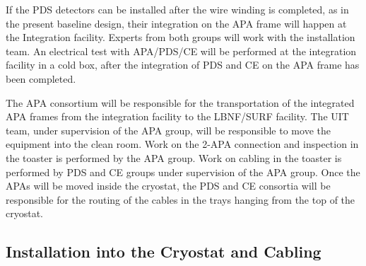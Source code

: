 
If the PDS detectors can be installed after the wire winding is completed, as in the present baseline design, their integration on the APA frame will happen at the Integration facility. Experts from both groups will work with the installation team. 
An electrical test with APA/PDS/CE will be performed at the integration facility in a cold box, after the integration of PDS and CE on the APA frame has been completed.

The APA consortium will be responsible for the transportation of the integrated APA frames from the integration facility to the LBNF/SURF facility. 
The UIT team, under supervision of the APA group, will be responsible to move the equipment into the clean room. 
Work on the 2-APA connection and inspection in the toaster is performed by the APA group.
Work on cabling in the toaster is performed by PDS and CE groups under supervision of the APA group.
Once the APAs will be moved inside the cryostat, the PDS and CE consortia will be responsible for the routing of the cables in the trays hanging from the top of the cryostat. 

\subsection{Installation into the Cryostat and Cabling}
\label{sec:fdsp-pd-install-pd-cryo}




